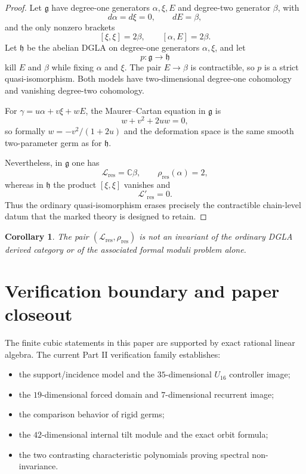 \documentclass[11pt]{amsart}
\newtheorem{corollary}[theorem]{Corollary}
\newcommand{\C}{\mathbb C}
\begin{document}
\begin{proof}
Let \(\mathfrak g\) have degree-one generators \(\alpha,\xi,E\) and degree-two generator \(\beta\), with
\[
d\alpha=d\xi=0,
\qquad
dE=\beta,
\]
and the only nonzero brackets
\[
[\xi,\xi]=2\beta,
\qquad
[\alpha,E]=2\beta.
\]
Let \(\mathfrak h\) be the abelian DGLA on degree-one generators \(\alpha,\xi\), and let
\[
p:\mathfrak g\longrightarrow\mathfrak h
\]
kill \(E\) and \(\beta\) while fixing \(\alpha\) and \(\xi\).  The pair \(E\to\beta\) is contractible, so \(p\) is a strict quasi-isomorphism.  Both models have two-dimensional degree-one cohomology and vanishing degree-two cohomology.

For \(\gamma=u\alpha+v\xi+wE\), the Maurer--Cartan equation in \(\mathfrak g\) is
\[
w+v^2+2uw=0,
\]
so formally \(w=-v^2/(1+2u)\) and the deformation space is the same smooth two-parameter germ as for \(\mathfrak h\).

Nevertheless, in \(\mathfrak g\) one has
\[
\mathcal L_{\mathrm{res}}=\C\beta,
\qquad
\rho_{\mathrm{res}}(\alpha)=2,
\]
whereas in \(\mathfrak h\) the product \([\xi,\xi]\) vanishes and
\[
\mathcal L'_{\mathrm{res}}=0.
\]
Thus the ordinary quasi-isomorphism erases precisely the contractible chain-level datum that the marked theory is designed to retain.
\end{proof}

\begin{corollary}
The pair \((\mathcal L_{\mathrm{res}},\rho_{\mathrm{res}})\) is not an invariant of the ordinary DGLA derived category or of the associated formal moduli problem alone.
\end{corollary}

\section{Verification boundary and paper closeout}

The finite cubic statements in this paper are supported by exact rational linear algebra.  The current Part II verification family establishes:

\begin{itemize}
\item the support/incidence model and the \(35\)-dimensional \(U_{16}\) controller image;
\item the \(19\)-dimensional forced domain and \(7\)-dimensional recurrent image;
\item the comparison behavior of rigid germs;
\item the \(42\)-dimensional internal tilt module and the exact orbit formula;
\item the two contrasting characteristic polynomials proving spectral non-invariance.
\end{itemize}
\end{document}
